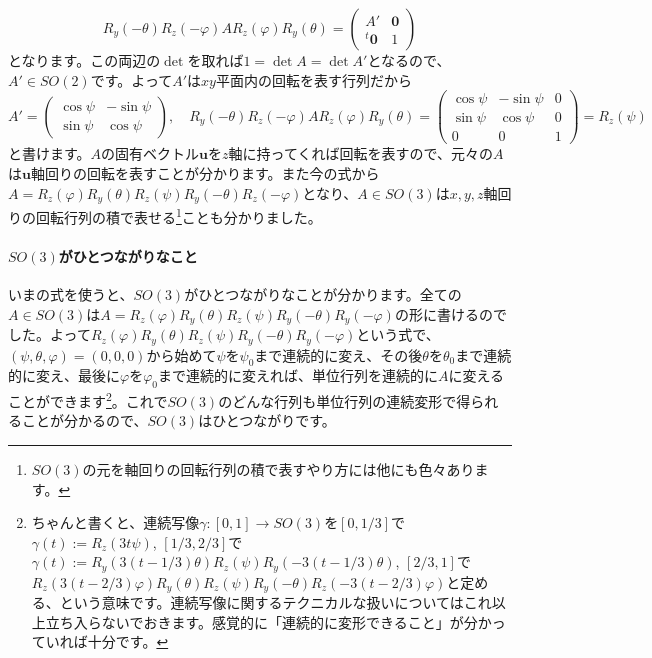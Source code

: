 \[
R_y(-\theta) R_z(-\varphi) A R_z(\varphi) R_y(\theta)
=
\begin{pmatrix}
A' & \bm{0} \\
{}^t\bm{0} & 1
\end{pmatrix}
\]
となります。この両辺の$\det$を取れば$1 = \det A = \det A'$となるので、$A' \in SO(2)$です。よって$A'$は$xy$平面内の回転を表す行列だから
\[
A' = 
\begin{pmatrix}
\cos \psi & - \sin \psi \\
\sin \psi & \cos \psi
\end{pmatrix}, \quad
R_y(-\theta) R_z(-\varphi) A R_z(\varphi) R_y(\theta)
=
\begin{pmatrix}
\cos \psi & - \sin \psi & 0 \\
\sin \psi & \cos \psi & 0 \\
0 & 0 & 1
\end{pmatrix}
= R_z(\psi)
\]
と書けます。$A$の固有ベクトル$\bm{u}$を$z$軸に持ってくれば回転を表すので、元々の$A$は$\bm{u}$軸回りの回転を表すことが分かります。また今の式から$A = R_z(\varphi) R_y(\theta) R_z(\psi) R_y(-\theta) R_z(-\varphi)$となり、$A \in SO(3)$は$x, y, z$軸回りの回転行列の積で表せる\footnote{$SO(3)$の元を軸回りの回転行列の積で表すやり方には他にも色々あります。}ことも分かりました。

\paragraph{$SO(3)$がひとつながりなこと}

いまの式を使うと、$SO(3)$がひとつながりなことが分かります。全ての$A \in SO(3)$は$A = R_z(\varphi) R_y(\theta) R_z(\psi) R_y(-\theta) R_y(-\varphi)$の形に書けるのでした。よって$R_z(\varphi) R_y(\theta) R_z(\psi) R_y(-\theta) R_y(-\varphi)$という式で、$(\psi, \theta, \varphi) = (0, 0, 0)$から始めて$\psi$を$\psi_0$まで連続的に変え、その後$\theta$を$\theta_0$まで連続的に変え、最後に$\varphi$を$\varphi_0$まで連続的に変えれば、単位行列を連続的に$A$に変えることができます\footnote{ちゃんと書くと、連続写像$\gamma \colon [0, 1] \rightarrow SO(3)$を$[0, 1/3]$で$\gamma(t):= R_z(3t\psi)$, $[1/3, 2/3]$で$\gamma(t):= R_y(3(t - 1/3)\theta) R_z(\psi) R_y(-3(t - 1/3)\theta)$, $[2/3, 1]$で$R_z(3(t - 2/3)\varphi) R_y(\theta) R_z(\psi) R_y(-\theta) R_z(-3(t - 2/3)\varphi)$と定める、という意味です。連続写像に関するテクニカルな扱いについてはこれ以上立ち入らないでおきます。感覚的に「連続的に変形できること」が分かっていれば十分です。}。これで$SO(3)$のどんな行列も単位行列の連続変形で得られることが分かるので、$SO(3)$はひとつながりです。

